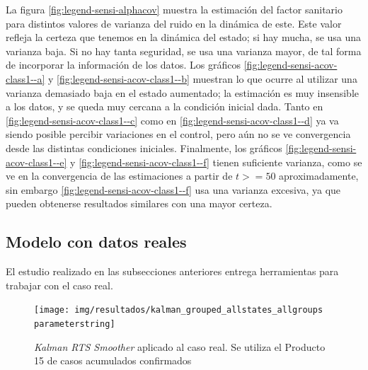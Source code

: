 La figura \ref{fig:legend-sensi-alphacov} muestra la estimación del factor sanitario para distintos valores de varianza del ruido en la dinámica de este. Este valor refleja la certeza que tenemos en la dinámica del estado; si hay mucha, se usa una varianza baja. Si no hay tanta seguridad, se usa una varianza mayor, de tal forma de incorporar la información de los datos. Los gráficos  \ref{fig:legend-sensi-acov-class1--a} y \ref{fig:legend-sensi-acov-class1--b}  muestran lo que ocurre al utilizar una varianza demasiado baja en el estado aumentado; la estimación es muy insensible a los datos, y se queda muy cercana a la condición inicial dada. Tanto en \ref{fig:legend-sensi-acov-class1--c} como en \ref{fig:legend-sensi-acov-class1--d} ya va siendo posible percibir variaciones en el control, pero aún no se ve convergencia desde las distintas condiciones iniciales. Finalmente, los gráficos  \ref{fig:legend-sensi-acov-class1--e} y \ref{fig:legend-sensi-acov-class1--f} tienen suficiente varianza, como se ve en la convergencia de las estimaciones a partir de \(t >=50\) aproximadamente, sin embargo \ref{fig:legend-sensi-acov-class1--f} usa una varianza excesiva, ya que pueden obtenerse resultados similares con una mayor certeza.




\subsection{Modelo con datos reales}\label{subsec:datosreales}

El estudio realizado en las subsecciones anteriores entrega herramientas para trabajar con el caso real.

\begin{figure}[!h]
\centering
\texttt{[image: img/resultados/kalman\_grouped\_allstates\_allgroups\\parameterstring]}
\caption[\textit{Kalman RTS Smoother} aplicado al caso real ]{\textit{Kalman RTS Smoother} aplicado al caso real. Se utiliza el Producto 15 de casos acumulados confirmados}
\label{all-nohigh}
\end{figure}



